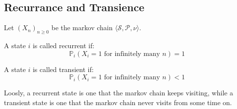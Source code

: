 \subsection{Recurrance and Transience}
Let \((X_n)_{n \geq 0}\) be the markov chain \(\langle \mathcal{S} , \mathcal{P} , \nu \rangle\).
\begin{definition}[Recurrence]
    A state \(i\) is called recurrent if:
    \[
        \mathbb{P}_i (X_i = 1 \text{ for infinitely many } n) = 1
    \] 
\end{definition}
\begin{definition}[Transience]
    A state \(i\) is called transient if:
    \[
        \mathbb{P}_i (X_i = 1 \text{ for infinitely many } n) < 1
    \]
\end{definition}
Loosly, a recurrent state is one that the markov chain keeps visiting, while a transient state is one that
the markov chain never visits from some time on.

